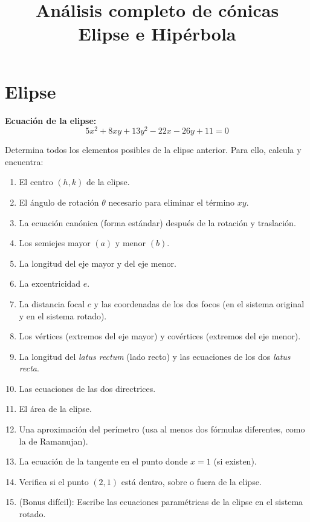 \documentclass[12pt, a4paper]{article}
\title{Análisis completo de cónicas \\ Elipse e Hipérbola}
\author{}
\date{}
\begin{document}
\maketitle

\section{Elipse}
\textbf{Ecuación de la elipse:}
\[
5x^{2} + 8xy + 13y^{2} - 22x - 26y + 11 = 0
\]

Determina todos los elementos posibles de la elipse anterior. Para ello, calcula y encuentra:

\begin{enumerate}
    \item El centro \((h, k)\) de la elipse.
    \item El ángulo de rotación \(\theta\) necesario para eliminar el término \(xy\).
    \item La ecuación canónica (forma estándar) después de la rotación y traslación.
    \item Los semiejes mayor \((a)\) y menor \((b)\).
    \item La longitud del eje mayor y del eje menor.
    \item La excentricidad \(e\).
    \item La distancia focal \(c\) y las coordenadas de los dos focos (en el sistema original y en el sistema rotado).
    \item Los vértices (extremos del eje mayor) y covértices (extremos del eje menor).
    \item La longitud del \textit{latus rectum} (lado recto) y las ecuaciones de los dos \textit{latus recta}.
    \item Las ecuaciones de las dos directrices.
    \item El área de la elipse.
    \item Una aproximación del perímetro (usa al menos dos fórmulas diferentes, como la de Ramanujan).
    \item La ecuación de la tangente en el punto donde \(x = 1\) (si existen).
    \item Verifica si el punto \((2,1)\) está dentro, sobre o fuera de la elipse.
    \item (Bonus difícil): Escribe las ecuaciones paramétricas de la elipse en el sistema rotado.
\end{enumerate}

\vspace{1.5cm}
\end{document}
